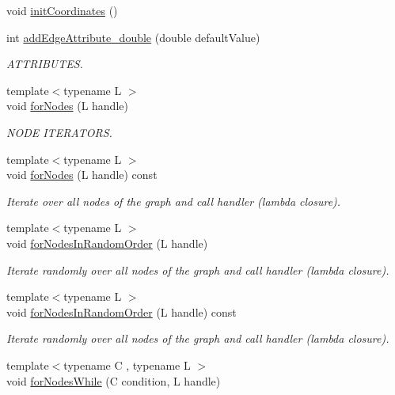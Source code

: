 \begin{DoxyCompactItemize}
\item 
void \hyperlink{class_networ_kit_1_1_graph_a035955129aefd1bc8a94773745a3e299}{init\-Coordinates} ()
\item 
int \hyperlink{class_networ_kit_1_1_graph_a465160318e06e6e9b03299dd5774cb04}{add\-Edge\-Attribute\-\_\-double} (double default\-Value)
\begin{DoxyCompactList}\small\item\em A\-T\-T\-R\-I\-B\-U\-T\-E\-S. \end{DoxyCompactList}\item 
{\footnotesize template$<$typename L $>$ }\\void \hyperlink{class_networ_kit_1_1_graph_a56bdf60b5d0b9f11d4211fea53f87e7a}{for\-Nodes} (L handle)
\begin{DoxyCompactList}\small\item\em N\-O\-D\-E I\-T\-E\-R\-A\-T\-O\-R\-S. \end{DoxyCompactList}\item 
{\footnotesize template$<$typename L $>$ }\\void \hyperlink{class_networ_kit_1_1_graph_a078067eec8fdce7f09afd974724a7f66}{for\-Nodes} (L handle) const 
\begin{DoxyCompactList}\small\item\em Iterate over all nodes of the graph and call handler (lambda closure). \end{DoxyCompactList}\item 
{\footnotesize template$<$typename L $>$ }\\void \hyperlink{class_networ_kit_1_1_graph_a20ee281bfa4cf7ce18a77073475b2677}{for\-Nodes\-In\-Random\-Order} (L handle)
\begin{DoxyCompactList}\small\item\em Iterate randomly over all nodes of the graph and call handler (lambda closure). \end{DoxyCompactList}\item 
{\footnotesize template$<$typename L $>$ }\\void \hyperlink{class_networ_kit_1_1_graph_a10d711188f360611e624051dd73e74a2}{for\-Nodes\-In\-Random\-Order} (L handle) const 
\begin{DoxyCompactList}\small\item\em Iterate randomly over all nodes of the graph and call handler (lambda closure). \end{DoxyCompactList}\item 
{\footnotesize template$<$typename C , typename L $>$ }\\void \hyperlink{class_networ_kit_1_1_graph_a0c49852d7969719b827f9f6fa8cacad5}{for\-Nodes\-While} (C condition, L handle)

\end{DoxyCompactItemize}
